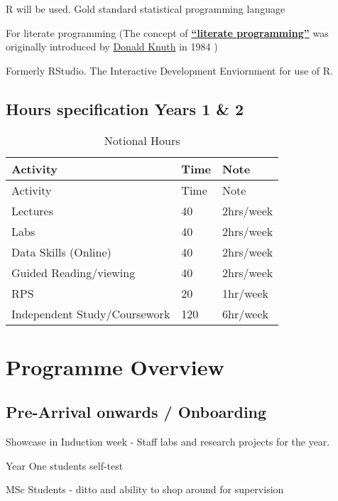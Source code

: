 \documentclass[
  11pt,
  letterpaper,
  oneside,
  open=any]{scrbook}
\begin{document}
R will be used. Gold standard statistical programming language

For literate programming (The concept of
\href{https://en.wikipedia.org/wiki/Literate_programming}{\textbf{``literate
programming''}} was originally introduced by
\href{http://www.literateprogramming.com/knuthweb.pdf}{Donald Knuth} in
1984 )

Formerly RStudio. The Interactive Development Enviornment for use of R.

\hypertarget{hours-specification-years-1-2}{%
\subsection{Hours specification Years 1 \&
2}\label{hours-specification-years-1-2}}

\begin{longtable}[]{@{}lll@{}}
\caption{Notional Hours}\tabularnewline
\toprule()
Activity & Time & Note \\
\midrule()
\endfirsthead
\toprule()
Activity & Time & Note \\
\midrule()
\endhead
Lectures & 40 & 2hrs/week \\
Labs & 40 & 2hrs/week \\
Data Skills (Online) & 40 & 2hrs/week \\
Guided Reading/viewing & 40 & 2hrs/week \\
RPS & 20 & 1hr/week \\
Independent Study/Coursework & 120 & 6hr/week \\
\bottomrule()
\end{longtable}

\hypertarget{programme-overview}{%
\section{Programme Overview}\label{programme-overview}}

\hypertarget{pre-arrival-onwards-onboarding}{%
\subsection{Pre-Arrival onwards /
Onboarding}\label{pre-arrival-onwards-onboarding}}

Showcase in Induction week - Staff labs and research projects for the
year.

Year One students self-test

MSc Students - ditto and ability to shop around for supervision
\end{document}
